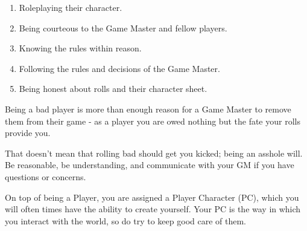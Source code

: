 \documentclass[../main.tex]{subfiles}
\begin{document}
    \begin{enumerate}
        \item Roleplaying their character.
        \item Being courteous to the Game Master and fellow players.
        \item Knowing the rules within reason.
        \item Following the rules and decisions of the Game Master.
        \item Being honest about rolls and their character sheet.
    \end{enumerate}

    Being a bad player is more than enough reason for a Game Master to remove them from their game - as a player you are owed nothing but the fate your rolls provide you.

    That doesn't mean that rolling bad should get you kicked; being an asshole will. Be reasonable, be understanding, and communicate with your GM if you have questions or concerns.

    On top of being a Player, you are assigned a Player Character (PC), which you will often times have the ability to create yourself. Your PC is the way in which you interact with the world, so do try to keep good care of them.
\end{document}

